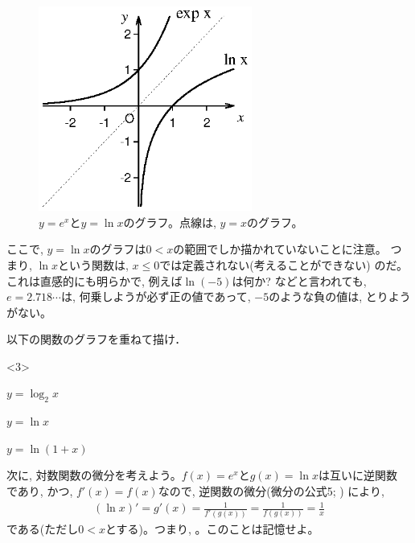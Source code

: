 \begin{figure}[h]
    \centering
    \includegraphics[width=7cm]{exp_log.eps}
    \caption{$y=e^x$と$y=\ln x$のグラフ。点線は, $y=x$のグラフ。}\label{exp_log.eps}
\end{figure}

ここで, $y=\ln x$のグラフは$0<x$の範囲でしか描かれていないことに注意。
つまり, $\ln x$という関数は, $x\le 0$では定義されない(考えることができない)
のだ。これは直感的にも明らかで, 例えば$\ln (-5)$は何か? などと言われても, 
$e=2.718\cdots$は, 何乗しようが必ず正の値であって, $-5$のような負の値は, とりようがない。

\begin{q}\label{q:exp_loggraph} 以下の関数のグラフを重ねて描け．
\begin{edaenumerate}<3>
\item $y=\log_{2}x$
\item $y=\ln x$
\item $y=\ln (1+x)$
\end{edaenumerate}\end{q}
\mv

次に, 対数関数の微分を考えよう。$f(x)=e^x$と$g(x)=\ln x$は互いに逆関数
であり, かつ, $f'(x)=f(x)$なので, 逆関数の微分(微分の公式5; )
により,
\begin{eqnarray}
(\ln x)'=g'(x)=\frac{1}{f'(g(x))}=\frac{1}{f(g(x))}=\frac{1}{x}
\label{eq:logdif}
\end{eqnarray}
である(ただし$0<x$とする)。つまり, 。このことは記憶せよ。
\mv

